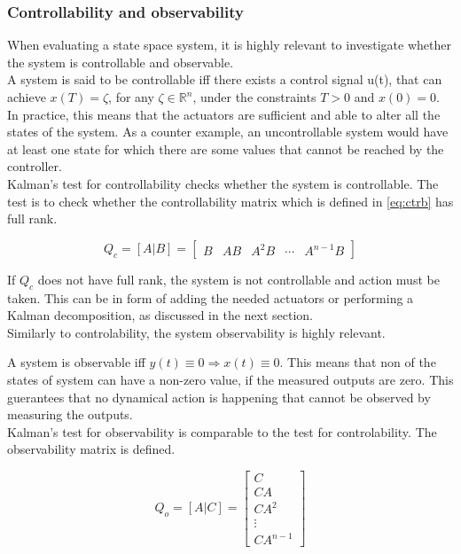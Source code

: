 \subsubsection{Controllability and observability}
When evaluating a state space system, it is highly relevant to investigate whether the system is controllable and observable. \\
A system is said to be controllable iff there exists a control signal u(t), that can achieve $x(T) = \zeta$, for any $\zeta \in \mathbb{R} ^{n}$, under the constraints $T>0$ and $x(0)=0$. In practice, this means that the actuators are sufficient and able to alter all the states of the system. As a counter example, an uncontrollable system would have at least one state for which there are some values that cannot be reached by the controller.\\
Kalman's test for controllability checks whether the system is controllable. The test is to check whether the controllability matrix which is defined in \cref{eq:ctrb} has full rank.

\begin{equation} \label{eq:ctrb}
	Q_c = [A|B] = \begin{bmatrix}  B & AB & A^2B & \cdots & A^{n-1}B  \end{bmatrix}
\end{equation}

If $Q_c$ does not have full rank, the system is not controllable and action must be taken. This can be in form of adding the needed actuators or performing a Kalman decomposition, as discussed in the next section.\\

Similarly to controlability, the system observability is highly relevant.

\noindent A system is observable iff $y(t) \equiv 0 \Rightarrow x(t) \equiv 0$. This means that non of the states of system can have a non-zero value, if the measured outputs are zero. This guerantees that no dynamical action is happening that cannot be observed by measuring the outputs.\\

Kalman's test for observability is comparable to the test for controlability. The observability matrix is defined.

\begin{equation}
	Q_o = [A|C] = \begin{bmatrix}
		C \\ CA \\ CA^2 \\ \vdots \\ CA^{n-1}
	\end{bmatrix}
\end{equation}

